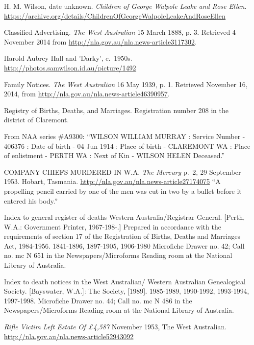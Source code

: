 \begin{thebibliography}{999}
	H. M. Wilson, date unknown. \emph{Children of George Walpole Leake and Rose Ellen}.
	\url{https://archive.org/details/ChildrenOfGeorgeWalpoleLeakeAndRoseEllen}

	Classified Advertising. \emph{The West Australian} 15 March 1888, p. 3.
	Retrieved 4 November 2014 from \url{http://nla.gov.au/nla.news-article3117302}.

	Harold Aubrey Hall and 'Darky', c.\ 1950s.
	\url{http://photos.samwilson.id.au/picture/1492}

	Family Notices. \emph{The West Australian} 16 May 1939, p. 1. Retrieved November 16, 2014, from \url{http://nla.gov.au/nla.news-article46390957}.

	Registry of Births, Deaths, and Marriages. Registration number 208 in the district of Claremont.

	From NAA series \#A9300: ``WILSON WILLIAM MURRAY : Service Number - 406376
	: Date of birth - 04 Jun 1914 : Place of birth - CLAREMONT WA
	: Place of enlistment - PERTH WA : Next of Kin - WILSON HELEN Deceased.''

	 COMPANY CHIEFS MURDERED IN W.A. \emph{The Mercury} p.\ 2, 29 September 1953. Hobart, Tasmania.
	 \url{http://nla.gov.au/nla.news-article27174075}
	 ``A propelling pencil carried by one of the men was cut in two by a bullet before it entered his body.''

	Index to general register of deaths Western Australia/Registrar General. [Perth, W.A.: Government Printer, 1967-198-.] Prepared in accordance with the requirements of section 17 of the Registration of Births, Deaths and Marriages Act, 1984-1956. 1841-1896, 1897-1905, 1906-1980 Microfiche Drawer no. 42; Call no. mc N 651 in the Newspapers/Microforms Reading room at the National Library of Australia.

	Index to death notices in the West Australian/ Western Australian Genealogical Society. [Bayswater, W.A.]: The Society, [1989]. 1985-1989, 1990-1992, 1993-1994, 1997-1998. Microfiche Drawer no. 44; Call no. mc N 486 in the Newspapers/Microforms Reading room at the National Library of Australia.

	\emph{Rifle Victim Left Estate Of \pounds 4,587} November 1953, The West Australian.
	\url{http://nla.gov.au/nla.news-article52943092}


\end{thebibliography}
